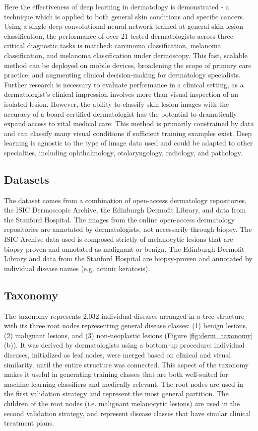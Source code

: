 Here the effectiveness of deep learning in dermatology is demonstrated - a technique which is applied to both general skin conditions and specific cancers. Using a single deep convolutional neural network trained at general skin lesion classification, the performance of over 21 tested dermatologists across three critical diagnostic tasks is matched: carcinoma classification, melanoma classification, and melanoma classification under dermoscopy. This fast, scalable method can be deployed on mobile devices, broadening the scope of primary care practice, and augmenting clinical decision-making for dermatology specialists. Further research is necessary to evaluate performance in a clinical setting, as a dermatologist’s clinical impression involves more than visual inspection of an isolated lesion. However, the ability to classify skin lesion images with the accuracy of a board-certified dermatologist has the potential to dramatically expand access to vital medical care. This method is primarily constrained by data and can classify many visual conditions if sufficient training examples exist. Deep learning is agnostic to the type of image data used and could be adapted to other specialties, including ophthalmology, otolaryngology, radiology, and pathology. 

\subsection{Datasets}
The dataset comes from a combination of open-access dermatology repositories, the ISIC Dermoscopic Archive, the Edinburgh Dermofit Library, and data from the Stanford Hospital. The images from the online open-access dermatology repositories are annotated by dermatologists, not necessarily through biopsy. The ISIC Archive data used is composed strictly of melanocytic lesions that are biopsy-proven and annotated as malignant or benign. The Edinburgh Dermofit Library and data from the Stanford Hospital are biopsy-proven and annotated by individual disease names (e.g. actinic keratosis). 

\subsection{Taxonomy}
The taxonomy represents 2,032 individual diseases arranged in a tree structure with its three root nodes representing general disease classes: (1) benign lesions, (2) malignant lesions, and (3) non-neoplastic lesions (Figure \ref{fig:derm_taxonomy}(b)). It was derived by dermatologists using a bottom-up procedure: individual diseases, initialized as leaf nodes, were merged based on clinical and visual similarity, until the entire structure was connected. This aspect of the taxonomy makes it useful in generating training classes that are both well-suited for machine learning classifiers and medically relevant. The root nodes are used in the first validation strategy and represent the most general partition. The children of the root nodes (i.e. malignant melanocytic lesions) are used in the second validation strategy, and represent disease classes that have similar clinical treatment plans.

